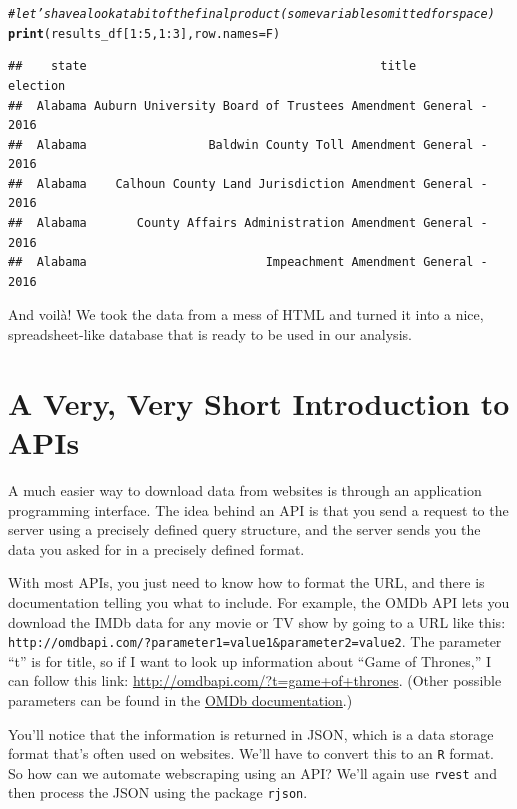 \documentclass{article}\usepackage[]{graphicx}\usepackage[]{color}
\makeatletter
\newcommand{\hlnum}[1]{\textcolor[rgb]{0.686,0.059,0.569}{#1}}%
\newcommand{\hlcom}[1]{\textcolor[rgb]{0.678,0.584,0.686}{\textit{#1}}}%
\newcommand{\hlopt}[1]{\textcolor[rgb]{0,0,0}{#1}}%
\newcommand{\hlstd}[1]{\textcolor[rgb]{0.345,0.345,0.345}{#1}}%
\newcommand{\hlkwc}[1]{\textcolor[rgb]{0.333,0.667,0.333}{#1}}%
\newcommand{\hlkwd}[1]{\textcolor[rgb]{0.737,0.353,0.396}{\textbf{#1}}}%
\newenvironment{kframe}{%
 \def\at@end@of@kframe{}%
 \ifinner\ifhmode%
  \def\at@end@of@kframe{\end{minipage}}%
  \begin{minipage}{\columnwidth}%
 \fi\fi%
 \def\FrameCommand##1{\hskip\@totalleftmargin \hskip-\fboxsep
 \colorbox{shadecolor}{##1}\hskip-\fboxsep
     \hskip-\linewidth \hskip-\@totalleftmargin \hskip\columnwidth}%
 \MakeFramed {\advance\hsize-\width
   \@totalleftmargin\z@ \linewidth\hsize
   \@setminipage}}%
 {\par\unskip\endMakeFramed%
 \at@end@of@kframe}
\newenvironment{knitrout}{}{} %
\makeatother
\begin{document}
\begin{knitrout}
\begin{kframe}
\begin{alltt}
\hlcom{# let's have a look at a bit of the final product (some variables omitted for space)}
\hlkwd{print}\hlstd{(results_df[}\hlnum{1}\hlopt{:}\hlnum{5}\hlstd{,} \hlnum{1}\hlopt{:}\hlnum{3}\hlstd{],} \hlkwc{row.names} \hlstd{= F)}
\end{alltt}
\begin{verbatim}
##    state                                         title       election
##  Alabama Auburn University Board of Trustees Amendment General - 2016
##  Alabama                 Baldwin County Toll Amendment General - 2016
##  Alabama    Calhoun County Land Jurisdiction Amendment General - 2016
##  Alabama       County Affairs Administration Amendment General - 2016
##  Alabama                         Impeachment Amendment General - 2016
\end{verbatim}
\end{kframe}
\end{knitrout}

And voil\`{a}! We took the data from a mess of HTML and turned it into a nice, spreadsheet-like database that is ready to be used in our analysis. 

\section{A Very, Very Short Introduction to APIs}

A much easier way to download data from websites is through an application programming interface. The idea behind an API is that you send a request to the server using a precisely defined query structure, and the server sends you the data you asked for in a precisely defined format. 

With most APIs, you just need to know how to format the URL, and there is documentation telling you what to include. For example, the OMDb API lets you download the IMDb data for any movie or TV show by going to a URL like this: \verb!http://omdbapi.com/?parameter1=value1&parameter2=value2!. The parameter ``t'' is for title, so if I want to look up information about ``Game of Thrones,'' I can follow this link: \href{http://omdbapi.com/?t=game+of+thrones}{http://omdbapi.com/?t=game+of+thrones}. (Other possible parameters can be found in the \href{http://www.omdbapi.com/}{OMDb documentation}.) 

You'll notice that the information is returned in JSON, which is a data storage format that's often used on websites. We'll have to convert this to an \texttt{R} format. So how can we automate webscraping using an API? We'll again use \texttt{rvest} and then process the JSON using the package \texttt{rjson}.
\end{document}
